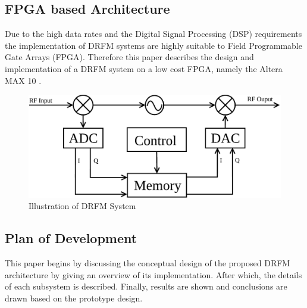 	\subsection{FPGA based Architecture}
	\noindent Due to the high data rates and the Digital Signal Processing (DSP) requirements the implementation of DRFM systems are highly suitable to Field Programmable Gate Arrays (FPGA). Therefore this paper describes the design and implementation of a DRFM system on a low cost FPGA, namely the Altera MAX 10 \cite{DE10lite}. 
	\begin{figure}[h!]
		\centering
		\includegraphics[width=0.8\linewidth]{img/DRFM_Intro}
		\caption{Illustration of DRFM System}
		\label{fig:DRFM_Intro}
	\end{figure}
	\subsection{Plan of Development}
	\noindent This paper begins by discussing the conceptual design of the proposed DRFM architecture by giving an overview of its implementation. After which, the details of each subsystem is described. Finally, results are shown and conclusions are drawn based on the prototype design.

		


